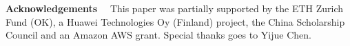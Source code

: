 \documentclass[10pt,twocolumn,letterpaper]{article}
\newlength \g
\begin{document}
\noindent\textbf{Acknowledgements}~~ This paper was partially supported by the ETH Zurich Fund (OK), a Huawei Technologies Oy (Finland) project, the China Scholarship Council and an Amazon AWS grant. Special thanks goes to Yijue Chen.



{\small


}
\end{document}
